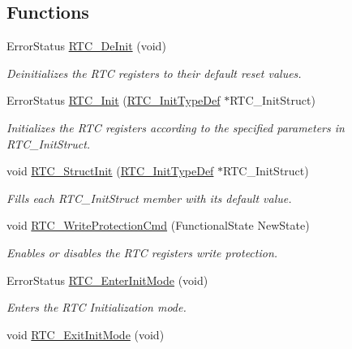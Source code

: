 \subsection*{Functions}
\begin{DoxyCompactItemize}
\item 
Error\-Status \hyperlink{group___r_t_c_ga9777c6cc4a99c339ebc527a791b2ebe7}{R\-T\-C\-\_\-\-De\-Init} (void)
\begin{DoxyCompactList}\small\item\em Deinitializes the R\-T\-C registers to their default reset values. \end{DoxyCompactList}\item 
Error\-Status \hyperlink{group___r_t_c_ga8eb747bf9698b2482ba6ef4d811de8e0}{R\-T\-C\-\_\-\-Init} (\hyperlink{struct_r_t_c___init_type_def}{R\-T\-C\-\_\-\-Init\-Type\-Def} $\ast$R\-T\-C\-\_\-\-Init\-Struct)
\begin{DoxyCompactList}\small\item\em Initializes the R\-T\-C registers according to the specified parameters in R\-T\-C\-\_\-\-Init\-Struct. \end{DoxyCompactList}\item 
void \hyperlink{group___r_t_c_gab466f3348de3236976e9aec7d6025dff}{R\-T\-C\-\_\-\-Struct\-Init} (\hyperlink{struct_r_t_c___init_type_def}{R\-T\-C\-\_\-\-Init\-Type\-Def} $\ast$R\-T\-C\-\_\-\-Init\-Struct)
\begin{DoxyCompactList}\small\item\em Fills each R\-T\-C\-\_\-\-Init\-Struct member with its default value. \end{DoxyCompactList}\item 
void \hyperlink{group___r_t_c_ga9d4bdfd3ae6957630d15d2497573b7c7}{R\-T\-C\-\_\-\-Write\-Protection\-Cmd} (Functional\-State New\-State)
\begin{DoxyCompactList}\small\item\em Enables or disables the R\-T\-C registers write protection. \end{DoxyCompactList}\item 
Error\-Status \hyperlink{group___r_t_c_ga679f8883cbfb267a53ffb1ab4cc5c8c5}{R\-T\-C\-\_\-\-Enter\-Init\-Mode} (void)
\begin{DoxyCompactList}\small\item\em Enters the R\-T\-C Initialization mode. \end{DoxyCompactList}\item 
void \hyperlink{group___r_t_c_ga87f86f3b794205f09a1eac51738d900f}{R\-T\-C\-\_\-\-Exit\-Init\-Mode} (void)

\end{DoxyCompactItemize}
